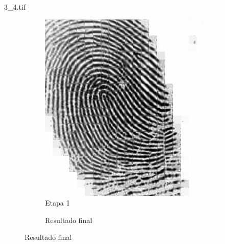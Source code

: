\documentclass{beamer}
\begin{document}
\begin{frame}{3\_4.tif}
\begin{figure}
\begin{subfigure}[!ht]{0.32\textwidth}
                \includegraphics[width=\columnwidth]{Fingerprints/3_4_intermediate.jpg}
                \caption{Etapa 1}
            \end{subfigure}
            \begin{subfigure}[!ht]{0.32\textwidth}
                \caption{Resultado final}
            \end{subfigure}
        \end{figure}
    \end{frame}
\end{document}
